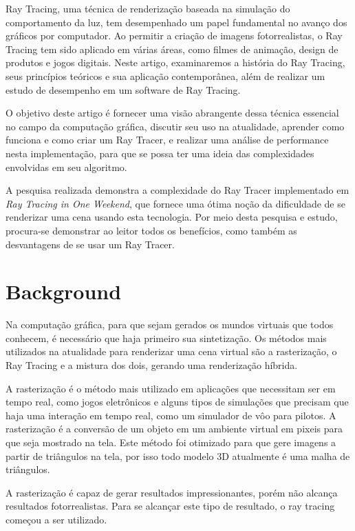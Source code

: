 \documentclass[journal]{IEEEtran}
\begin{document}
 Ray Tracing, uma técnica de renderização baseada na simulação do 
comportamento da luz, tem desempenhado um papel fundamental no avanço
dos gráficos por computador. Ao permitir a criação de imagens fotorrealistas, 
o Ray Tracing tem sido aplicado em várias áreas, como filmes de animação,
design de produtos e jogos digitais. Neste artigo, examinaremos a história 
do Ray Tracing, seus princípios teóricos e sua aplicação contemporânea, além 
de realizar um estudo de desempenho em um software de Ray Tracing. 

O objetivo deste artigo é fornecer uma visão abrangente dessa técnica essencial
no campo da computação gráfica, discutir seu uso na atualidade, aprender como
funciona e como criar um Ray Tracer, e realizar uma análise de performance nesta
implementação, para que se possa ter uma ideia das complexidades envolvidas em
seu algoritmo.

A pesquisa realizada demonstra a complexidade do Ray Tracer implementado em \emph{Ray
Tracing in One Weekend}, que fornece uma ótima noção da dificuldade de se renderizar
uma cena usando esta tecnologia. Por meio desta pesquisa e estudo, procura-se demonstrar
ao leitor todos os benefícios, como também as desvantagens de se usar um Ray Tracer.

\section{Background}

Na computação gráfica, para que sejam gerados os mundos virtuais que todos conhecem,
é necessário que haja primeiro sua sintetização. Os métodos mais utilizados na atualidade
para renderizar uma cena virtual são a rasterização, o Ray Tracing e a mistura dos dois,
gerando uma renderização híbrida.

A rasterização é o método mais utilizado em aplicações que necessitam ser em tempo
real, como jogos eletrônicos e alguns tipos de simulações que precisam que haja
uma interação em tempo real, como um simulador de vôo para pilotos. A rasterização
é a conversão de um objeto em um ambiente virtual em pixeis para que seja mostrado
na tela. Este método foi otimizado para que gere imagens a partir de triângulos na
tela, por isso todo modelo 3D atualmente é uma malha de triângulos.
\cite{c12}

A rasterização é capaz de gerar resultados impressionantes, porém não alcança 
resultados fotorrealistas. Para se alcançar este tipo de resultado, o ray tracing
começou a ser utilizado.
\end{document}
